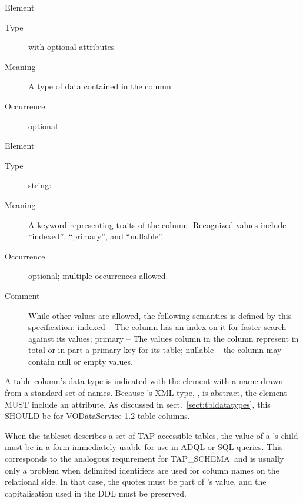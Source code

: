\documentclass[11pt,a4paper]{ivoa}
\newcommand{\tapschema}{TAP\_SCHE\-MA}
\newcommand{\tapschema}{\mbox{%
  TAP\discretionary{-}{}{\kern-2pt\_}SCHEMA}}
\begin{document}
\begin{generated}
\begingroup\small\begin{bigdescription}\item[Element \xmlel{dataType}]
\begin{description}
\item[Type]  with optional attributes
\item[Meaning]
                        A type of data contained in the column

\item[Occurrence] optional

\end{description}
\item[Element \xmlel{flag}]
\begin{description}
\item[Type] string: 
\item[Meaning]
                        A keyword representing traits of the column.
                        Recognized values include “indexed”, “primary”, and
                        “nullable”.

\item[Occurrence] optional; multiple occurrences allowed.
\item[Comment]
                     	While other values are allowed, the following semantics
                     	is defined by this specification: indexed – The column
                     	has an index on it for faster search against its values;
                     	primary – The values column in the column represent in
                     	total or in part a primary key for its table; nullable –
                     	the column may contain null or empty values.


\end{description}


\end{bigdescription}\endgroup

\endgroup
\end{generated}



A table column's data type is indicated with the 
element with a name drawn from a standard set of names.
Because 's
XML type, , is abstract, the
element MUST include an
 attribute.  As discussed in
sect.~\ref{sect:tbldatatypes}, this SHOULD be
 for VODataService 1.2 table columns.

When the tableset describes a set of TAP-accessible tables, the value of
a 's  child must be in a form immediately
usable for use in ADQL or SQL queries. This corresponds to the analogous
requirement for \tapschema\ and is usually only a problem when delimited
identifiers are used for column names on the relational side.  In that
case, the quotes must be part of 's value, and the
capitalisation used in the DDL must be preserved.
\end{document}
